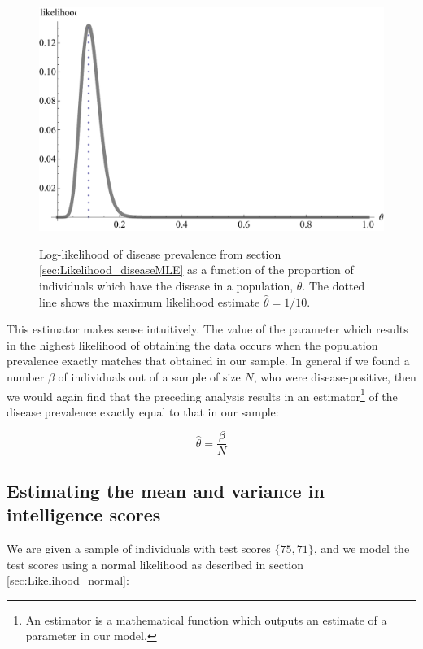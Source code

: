 \documentclass[11pt,fullpage]{book}
\begin{document}
\begin{figure}
\centering
\scalebox{0.75} 
{\includegraphics{Likelihood_ML.pdf}}
\caption{Log-likelihood of disease prevalence from section \ref{sec:Likelihood_diseaseMLE} as a function of the proportion of individuals which have the disease in a population, $\theta$. The dotted line shows the maximum likelihood estimate $\hat{\theta}=1/10$.}\label{fig:Likelihood_MLE}
\end{figure}


This estimator makes sense intuitively. The value of the parameter which results in the highest likelihood of obtaining the data occurs when the population prevalence exactly matches that obtained in our sample. In general if we found a number $\beta$ of individuals out of a sample of size $N$, who were disease-positive, then we would again find that the preceding analysis results in an estimator\footnote{An estimator is a mathematical function which outputs an estimate of a parameter in our model.} of the disease prevalence exactly equal to that in our sample:

\begin{equation}\label{eq:Likelihood_binomialestimator}
\hat{\theta} = \frac{\beta}{N}
\end{equation}

\subsection{Estimating the mean and variance in intelligence scores}
We are given a sample of individuals with test scores $\{75,71\}$, and we model the test scores using a normal likelihood as described in section \ref{sec:Likelihood_normal}:
\end{document}
